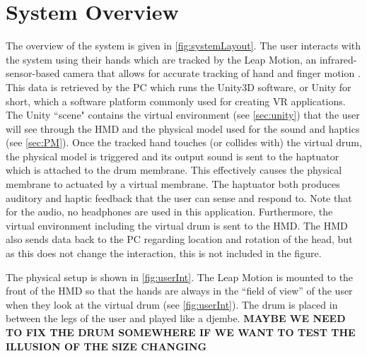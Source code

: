 \documentclass{vgtc}
\begin{document}
\section{System Overview} \label{sec:sys}
The overview of the system is given in \autoref{fig:systemLayout}. The user interacts with the system using their hands which are tracked by the Leap Motion, an infrared-sensor-based camera that allows for accurate tracking of hand and finger motion . This data is retrieved by the PC which runs the Unity3D software, or Unity for short, which a software platform commonly used for creating VR applications. The Unity ``scene" contains the virtual environment (see \autoref{sec:unity}) that the user will see through the HMD and the physical model used for the sound and haptics (see \autoref{sec:PM}). Once the tracked hand touches (or collides with) the virtual drum, the physical model is triggered and its output sound is sent to the haptuator which is attached to the drum membrane. This effectively causes the physical membrane to actuated by a virtual membrane. The haptuator both produces auditory and haptic feedback that the user can sense and respond to. Note that for the audio, no headphones are used in this application. Furthermore, the virtual environment including the virtual drum is sent to the HMD. The HMD also sends data back to the PC regarding location and rotation of the head, but as this does not change the interaction, this is not included in the figure. 

The physical setup is shown in \autoref{fig:userInt}. The Leap Motion is mounted to the front of the HMD so that the hands are always in the ``field of view'' of the user when they look at the virtual drum (see \autoref{fig:userInt}). The drum is placed in between the legs of the user and played like a djembe. \textbf{MAYBE WE NEED TO FIX THE DRUM SOMEWHERE IF WE WANT TO TEST THE ILLUSION OF THE SIZE CHANGING}
\end{document}
